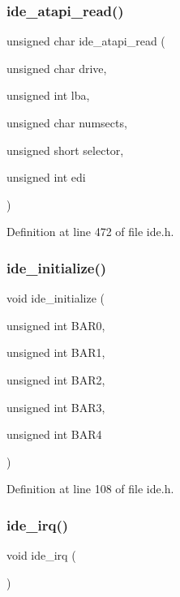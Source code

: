 \subsubsection{\texorpdfstring{ide\+\_\+atapi\+\_\+read()}{ide\_atapi\_read()}}
{\footnotesize\ttfamily unsigned char ide\+\_\+atapi\+\_\+read (\begin{DoxyParamCaption}\item[{unsigned char}]{drive,  }\item[{unsigned int}]{lba,  }\item[{unsigned char}]{numsects,  }\item[{unsigned short}]{selector,  }\item[{unsigned int}]{edi }\end{DoxyParamCaption})}



Definition at line 472 of file ide.\+h.

\mbox{\label{a00005_ab5397c8432be802172da8f04c8840ca3_ab5397c8432be802172da8f04c8840ca3}} 
\subsubsection{\texorpdfstring{ide\+\_\+initialize()}{ide\_initialize()}}
{\footnotesize\ttfamily void ide\+\_\+initialize (\begin{DoxyParamCaption}\item[{unsigned int}]{B\+A\+R0,  }\item[{unsigned int}]{B\+A\+R1,  }\item[{unsigned int}]{B\+A\+R2,  }\item[{unsigned int}]{B\+A\+R3,  }\item[{unsigned int}]{B\+A\+R4 }\end{DoxyParamCaption})}



Definition at line 108 of file ide.\+h.

\mbox{\label{a00005_ad7ea572af581cc0623a2fb74a579ca83_ad7ea572af581cc0623a2fb74a579ca83}} 
\subsubsection{\texorpdfstring{ide\+\_\+irq()}{ide\_irq()}}
{\footnotesize\ttfamily void ide\+\_\+irq (\begin{DoxyParamCaption}{ }\end{DoxyParamCaption})}



